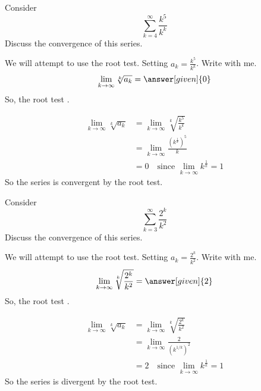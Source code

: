 \documentclass{ximera}
\begin{document}
\begin{example}
  Consider 
  \[
  \sum_{k=4}^\infty \frac{k^5}{k^k}
  \]
  Discuss the convergence of this series.
  \begin{explanation}
    We will attempt to use the root test. Setting
    $a_k=\frac{k^5}{k^k}$. Write with me.
    \[
    \lim_{k \to \infty} \sqrt[k]{a_k} = \answer[given]{0}	
    \]
    So, the root test
	  .		
	  \begin{hint}
            \begin{align*}
	      \lim_{k \to \infty} \sqrt[k]{a_k} &= \lim_{k \to \infty} \sqrt[k]{\frac{k^5}{k^k}}\\
	      &=\lim_{k \to \infty} \frac{(k^{\frac{1}{k}})^5}{k}\\
	      &=0 \quad\text{since $\lim_{k \to \infty} k^\frac{1}{k} = 1$}
	    \end{align*}
	    So the series is convergent by the root test.
	  \end{hint}
  \end{explanation}
\end{example}

\begin{example}
  Consider 
  \[
  \sum_{k=3}^\infty \frac{2^k}{k^2}
  \]
  Discuss the convergence of this series.
  \begin{explanation}
    We will attempt to use the root test. Setting
    $a_k=\frac{2^k}{k^2}$. Write with me.
    \[
    \lim_{k \to \infty} \sqrt[k]{\frac{2^k}{k^2}} = \answer[given]{2}	
    \]
    So, the root test
	  .		
	  \begin{hint}
            \begin{align*}
	      \lim_{k \to \infty} \sqrt[k]{a_k} &= \lim_{k \to \infty} \sqrt[k]{\frac{2^k}{k^2}}\\
	      &=\lim_{k \to \infty} \frac{2}{(k^{1/k})^2}\\
	      &=2 \quad\text{since $\lim_{k \to \infty} k^\frac{1}{k} = 1$}
	    \end{align*}
	    So the series is divergent by the root test.
	  \end{hint}
  \end{explanation}
\end{example}
\end{document}
